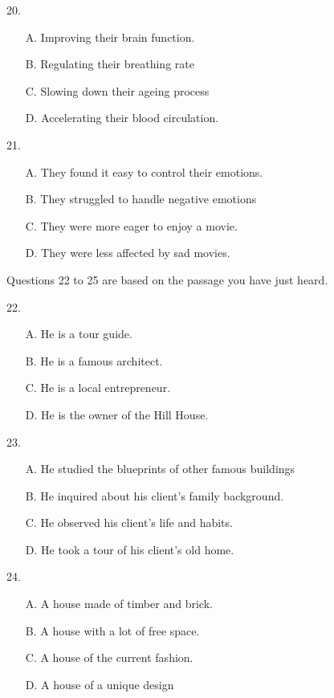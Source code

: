 \documentclass[UTF8,11pt]{ctexart}
\begin{document}
20.


\begin{itemize}[leftmargin=2em,itemsep=.2em,topsep=.4em]\item[A.] Improving their brain function.
\item[B.] Regulating their breathing rate
\item[C.] Slowing down their ageing process
\item[D.] Accelerating their blood circulation.
\end{itemize}

21.


\begin{itemize}[leftmargin=2em,itemsep=.2em,topsep=.4em]\item[A.] They found it easy to control their emotions.
\item[B.] They struggled to handle negative emotions
\item[C.] They were more eager to enjoy a movie.
\item[D.] They were less affected by sad movies.
\end{itemize}

Questions 22 to 25 are based on the passage you have just heard.


22.


\begin{itemize}[leftmargin=2em,itemsep=.2em,topsep=.4em]\item[A.] He is a tour guide.
\item[B.] He is a famous architect.
\item[C.] He is a local entrepreneur.
\item[D.] He is the owner of the Hill House.
\end{itemize}

23.


\begin{itemize}[leftmargin=2em,itemsep=.2em,topsep=.4em]\item[A.] He studied the blueprints of other famous buildings
\item[B.] He inquired about his client's family background.
\item[C.] He observed his client's life and habits.
\item[D.] He took a tour of his client's old home.
\end{itemize}

24.


\begin{itemize}[leftmargin=2em,itemsep=.2em,topsep=.4em]\item[A.] A house made of timber and brick.
\item[B.] A house with a lot of free space.
\item[C.] A house of the current fashion.
\item[D.] A house of a unique design
\end{itemize}
\end{document}
